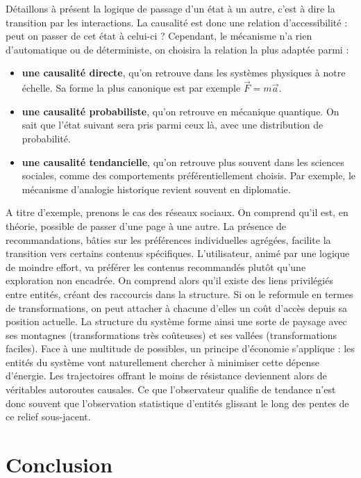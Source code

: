 \documentclass[11pt]{article}
\begin{document}
	Détaillons à présent la logique de passage d'un état à un autre, c'est à dire la transition par les interactions. La causalité est donc une relation d'accessibilité : peut on passer de cet état à celui-ci ? 
	Cependant, le mécanisme n'a rien d'automatique ou de déterministe, on choisira la relation la plus adaptée parmi : 
	\begin{itemize}
		\item \textbf{une causalité directe}, qu'on retrouve dans les systèmes physiques à notre échelle. Sa forme la plus canonique est par exemple $\vec{F} = m\vec{a}$. 
		\item \textbf{une causalité probabiliste}, qu'on retrouve en mécanique quantique. On sait que l'état suivant sera pris parmi ceux là, avec une distribution de probabilité. 
		\item \textbf{une causalité tendancielle}, qu'on retrouve plus souvent dans les sciences sociales, comme des comportements préférentiellement choisis. Par exemple, le mécanisme d'analogie historique revient souvent en diplomatie. 
	\end{itemize}
	
	A titre d'exemple, prenons le cas des réseaux sociaux. On comprend qu'il est, en théorie, possible de passer d'une page à une autre. La présence de recommandations, bâties sur les préférences individuelles agrégées, facilite la transition vers certains contenus spécifiques. L'utilisateur, animé par une logique de moindre effort, va préférer les contenus recommandés plutôt qu'une exploration non encadrée. On comprend alors qu'il existe des liens privilégiés entre entités, créant des raccourcis dans la structure. Si on le reformule en termes de transformations, on peut attacher à chacune d'elles un coût d'accès depuis sa position actuelle. La structure du système forme ainsi une sorte de \og{}paysage\fg{} avec ses montagnes (transformations très coûteuses) et ses vallées (transformations faciles). Face à une multitude de possibles, un principe d'économie s'applique : les entités du système vont naturellement chercher à minimiser cette dépense d'énergie. Les trajectoires offrant le moins de résistance deviennent alors de véritables autoroutes causales. Ce que l'observateur qualifie de \og{}tendance\fg{} n'est donc souvent que l'observation statistique d'entités glissant le long des pentes de ce relief sous-jacent.
	
	
	
	\section{Conclusion}
	
\end{document}
